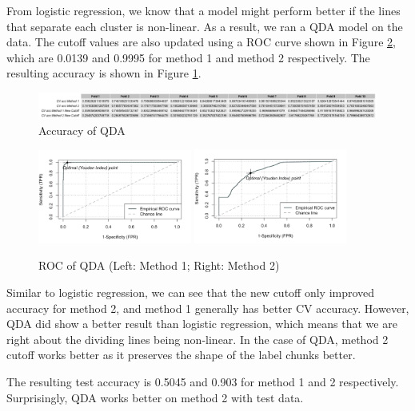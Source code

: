 \documentclass[11pt]{article}
\begin{document}
From logistic regression, we know that a model might perform better if the lines that separate each cluster is non-linear. As a result, we ran a QDA model on the data. The cutoff values are also updated using a ROC curve shown in Figure \ref{fig:3-3-2}, which are 0.0139 and 0.9995 for method 1 and method 2 respectively. The resulting accuracy is shown in Figure \ref{fig:3-3-1}.

\begin{figure}[h]
\includegraphics[width=\textwidth]{3-3-1.png}
\centering
\caption{Accuracy of QDA}
\label{fig:3-3-1}
\centering
\end{figure}

\begin{figure}[h]
\includegraphics[width=0.45\textwidth]{qda_1.jpeg}
\includegraphics[width=0.45\textwidth]{qda_2.jpeg}
\centering
\caption{ROC of QDA (Left: Method 1; Right: Method 2)}
\label{fig:3-3-2}
\centering
\end{figure}

Similar to logistic regression, we can see that the new cutoff only improved accuracy for method 2, and method 1 generally has better CV accuracy. However, QDA did show a better result than logistic regression, which means that we are right about the dividing lines being non-linear. In the case of QDA, method 2 cutoff works better as it preserves the shape of the label chunks better.

The resulting test accuracy is 0.5045 and 0.903 for method 1 and 2 respectively. Surprisingly, QDA works better on method 2 with test data.
\end{document}
